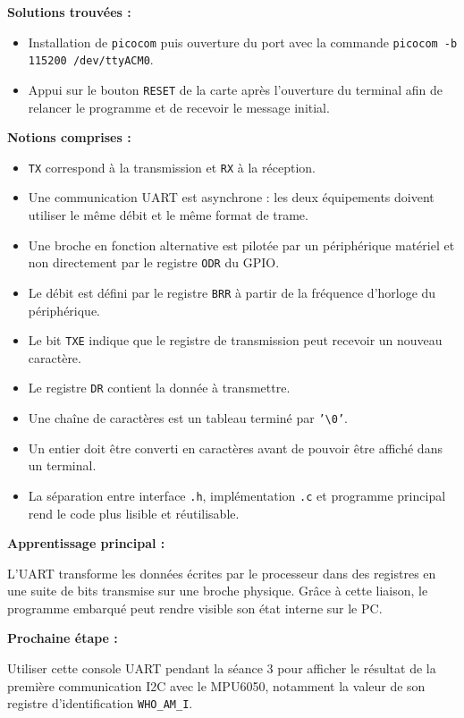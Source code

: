 \documentclass[11pt,a4paper]{article}
\begin{document}
\begin{sessionbox}
		\vspace{0.3cm}
		
		\textbf{Solutions trouvées :}
		
		\begin{itemize}
			\item Installation de \texttt{picocom} puis ouverture du port avec la commande \texttt{picocom -b 115200 /dev/ttyACM0}.
			\item Appui sur le bouton \texttt{RESET} de la carte après l'ouverture du terminal afin de relancer le programme et de recevoir le message initial.
		\end{itemize}
		
		\vspace{0.3cm}
		
		\textbf{Notions comprises :}
		
		\begin{itemize}
			\item \texttt{TX} correspond à la transmission et \texttt{RX} à la réception.
			\item Une communication UART est asynchrone : les deux équipements doivent utiliser le même débit et le même format de trame.
			\item Une broche en fonction alternative est pilotée par un périphérique matériel et non directement par le registre \texttt{ODR} du GPIO.
			\item Le débit est défini par le registre \texttt{BRR} à partir de la fréquence d'horloge du périphérique.
			\item Le bit \texttt{TXE} indique que le registre de transmission peut recevoir un nouveau caractère.
			\item Le registre \texttt{DR} contient la donnée à transmettre.
			\item Une chaîne de caractères est un tableau terminé par \texttt{'\textbackslash 0'}.
			\item Un entier doit être converti en caractères avant de pouvoir être affiché dans un terminal.
			\item La séparation entre interface \texttt{.h}, implémentation \texttt{.c} et programme principal rend le code plus lisible et réutilisable.
		\end{itemize}
		
		\vspace{0.3cm}
		
		\textbf{Apprentissage principal :}
		
		L'UART transforme les données écrites par le processeur dans des registres en une suite de bits transmise sur une broche physique. Grâce à cette liaison, le programme embarqué peut rendre visible son état interne sur le PC.
		
		\vspace{0.3cm}
		
		\textbf{Prochaine étape :}
		
		Utiliser cette console UART pendant la séance 3 pour afficher le résultat de la première communication I2C avec le MPU6050, notamment la valeur de son registre d'identification \texttt{WHO\_AM\_I}.
		
	\end{sessionbox}
	
\end{document}
